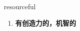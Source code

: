 
\begin{frame}
{\huge resourceful}
\begin{center}
\begin{enumerate}\Large
  \item \textbf{有创造力的，机智的}
\end{enumerate}
\end{center}
\end{frame}
